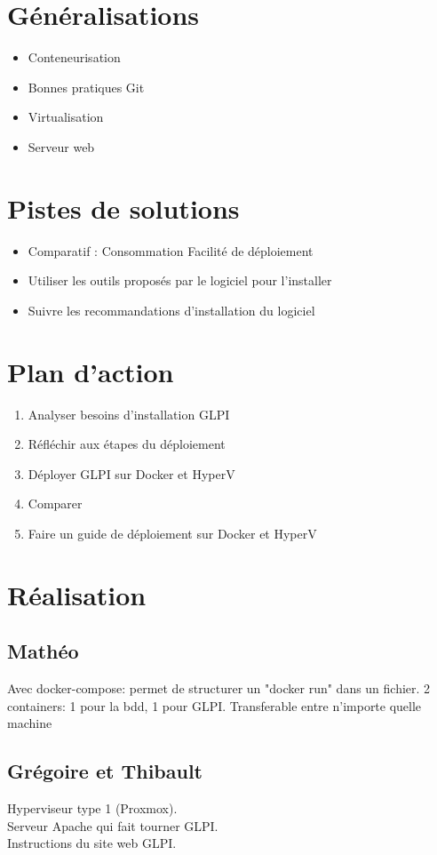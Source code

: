 \documentclass{article}
\begin{document}
\section{Généralisations}
\begin{itemize}
  \item Conteneurisation
  \item Bonnes pratiques Git
  \item Virtualisation
  \item Serveur web
\end{itemize}

\section{Pistes de solutions}
\begin{itemize}
  \item Comparatif :
  \subitem Consommation
  \subitem Facilité de déploiement
  \item Utiliser les outils proposés par le logiciel pour l'installer
  \item Suivre les recommandations d'installation du logiciel
\end{itemize}

\section{Plan d'action}
\begin{enumerate}
  \item Analyser besoins d'installation GLPI
  \item Réfléchir aux étapes du déploiement
  \item Déployer GLPI sur Docker et HyperV
  \item Comparer
  \item Faire un guide de déploiement sur Docker et HyperV
\end{enumerate}

\section{Réalisation}

\subsection{Mathéo}
Avec docker-compose: permet de structurer un "docker run" dans un fichier. 2 containers: 1 pour la bdd, 1 pour GLPI. Transferable entre n'importe quelle machine

\subsection{Grégoire et Thibault}
Hyperviseur type 1 (Proxmox).\\
Serveur Apache qui fait tourner GLPI.\\
Instructions du site web GLPI.\
\end{document}
